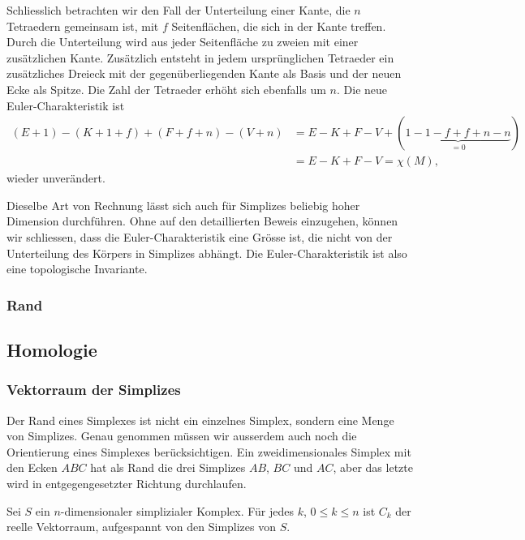 Schliesslich betrachten wir den Fall der Unterteilung einer Kante,
die $n$ Tetraedern gemeinsam ist, mit $f$ Seitenflächen, die sich
in der Kante treffen.
Durch die Unterteilung wird aus jeder Seitenfläche zu zweien
mit einer zusätzlichen Kante.
Zusätzlich entsteht in jedem ursprünglichen Tetraeder ein zusätzliches
Dreieck mit der gegenüberliegenden Kante als Basis und der neuen
Ecke als Spitze.
Die Zahl der Tetraeder erhöht sich ebenfalls um $n$.
Die neue Euler-Charakteristik ist
\begin{align*}
(E+1)
-
(K+1+f)
+
(F+f+n)
-
(V+n)
&=
E-K+F-V + (\underbrace{1-1-f+f+n-n}_{\displaystyle=0})
\\
&=
E-K+F-V
=
\chi(M),
\end{align*}
wieder unverändert.

Dieselbe Art von Rechnung lässt sich auch für Simplizes beliebig hoher
Dimension durchführen.
Ohne auf den detaillierten Beweis einzugehen, können wir schliessen,
dass die Euler-Charakteristik eine Grösse ist, die nicht von der Unterteilung
des Körpers in Simplizes abhängt.
Die Euler-Charakteristik ist also eine topologische Invariante.

%
%
\subsubsection{Rand}


%
%
\subsection{Homologie}

\subsubsection{Vektorraum der Simplizes}
Der Rand eines Simplexes ist nicht ein einzelnes Simplex, sondern
eine Menge von Simplizes.
Genau genommen müssen wir ausserdem auch noch die Orientierung eines
Simplexes berücksichtigen.
Ein zweidimensionales Simplex mit den Ecken $ABC$ hat als Rand
die drei Simplizes $AB$, $BC$ und $AC$, aber das letzte wird in
entgegengesetzter Richtung durchlaufen.

\begin{definition}
Sei $S$ ein $n$-dimensionaler simplizialer Komplex.
Für jedes $k$, $0\le k\le n$ ist $C_k$ der reelle Vektorraum, aufgespannt
von den Simplizes von $S$.
\end{definition}



